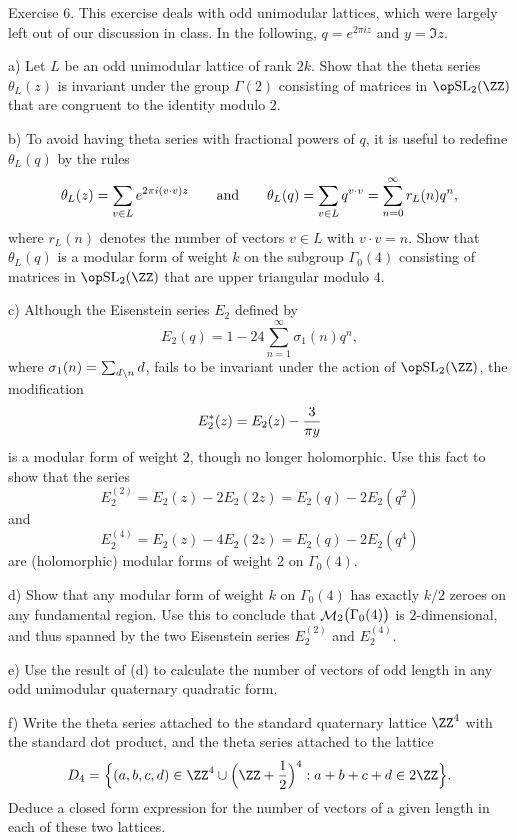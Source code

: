 \nineproclaim Exercise 6. This exercise deals with odd unimodular lattices, which were largely left out of
our discussion in class. In the following, $q = e^{2\pi i z}$ and $y = \Im z$.
\medskip
\item{a)} Let $L$ be an odd unimodular lattice of rank $2k$. Show that the theta series $\theta_L(z)$
is invariant under the group $\Gamma(2)$ consisting of matrices in $\SL_2(\ZZ)$ that are congruent to the
identity modulo $2$.
\smallskip
\item{b)} To avoid having theta series with fractional powers of $q$, it is useful to redefine $\theta_L(q)$
by the rules
$$\theta_L(z) = \sum_{v\in L} e^{2\pi i(v\cdot v)z}\qquad\hbox{and}\qquad
\theta_L(q) = \sum_{v\in L} q^{v\cdot v} = \sum_{n=0}^\infty r_L(n)q^n,$$
where $r_L(n)$ denotes the number of vectors $v\in L$ with $v\cdot v = n$. Show that $\theta_L(q)$ is a
modular form of weight $k$ on the subgroup $\Gamma_0(4)$ consisting of matrices in $\SL_2(\ZZ)$ that are
upper triangular modulo $4$.
\smallskip
\item{c)} Although the Eisenstein series $E_2$ defined by
$$E_2(q) = 1-24\sum_{n=1}^\infty \sigma_1(n)q^n,$$
where $\sigma_1(n) = \sum_{d\mathrel\backslash n} d$, fails to be invariant under the action of $\SL_2(\ZZ)$, the
modification
$$E_2^*(z) = E_2(z) - {3\over \pi y}$$
is a modular form of weight $2$, though no longer holomorphic. Use this fact to show that the series
$$E_2^{(2)} = E_2(z) - 2E_2(2z) = E_2(q) - 2E_2(q^2)$$
and
$$E_2^{(4)} = E_2(z) - 4E_2(2z) = E_2(q) - 2E_2(q^4)$$
are (holomorphic) modular forms of weight $2$ on $\Gamma_0(4)$.
\smallskip
\item{d)} Show that any modular form of weight $k$ on $\Gamma_0(4)$ has exactly $k/2$ zeroes on any fundamental
region. Use this to conclude that $\mathop{\cal M}\nolimits_2\bigl(\Gamma_0(4)\bigr)$ is $2$-dimensional, and thus spanned by
the two Eisenstein series $E_2^{(2)}$ and $E_2^{(4)}$.
\smallskip
\item{e)} Use the result of (d) to calculate the number of vectors of odd length in any odd unimodular
quaternary quadratic form.
\smallskip
\item{f)} Write the theta series attached to the standard quaternary lattice $\ZZ^4$ with the standard dot
product, and the theta series attached to the lattice
$$D_4 = \Big\{ (a,b,c,d) \in \ZZ^4 \cup  \Bigl(\ZZ+{1\over 2}\Bigr)^4
: a+b+c+d\in 2\ZZ\Big\}.$$
Deduce a closed form expression for the number of vectors of a given
length in each of these two lattices.
\medskip

